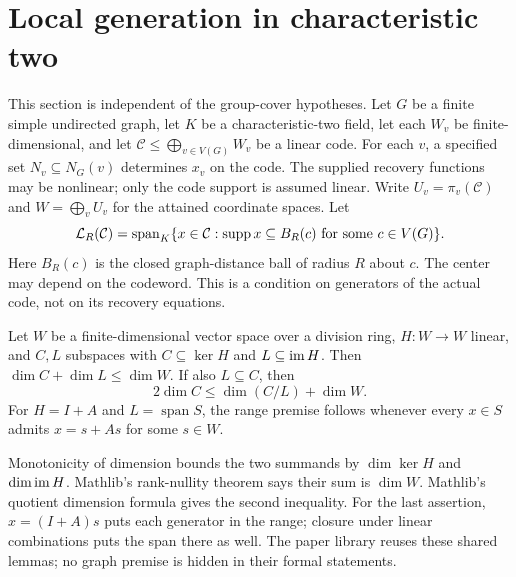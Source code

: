\section{Local generation in characteristic two}\label{sec:local}

This section is independent of the group-cover hypotheses. Let $G$
be a finite simple undirected graph, let $K$ be a characteristic-two
field, let each $W_v$ be finite-dimensional, and let
$\mathcal C\le\bigoplus_{v\in V(G)}W_v$ be a linear code.
For each $v$, a specified set $N_v\subseteq N_G(v)$ determines
$x_v$ on the code. The supplied recovery functions may be nonlinear;
only the code support is assumed linear. Write
$U_v=\pi_v(\mathcal C)$ and $W=\bigoplus_vU_v$ for the attained
coordinate spaces. Let
\[
 \mathcal L_R(\mathcal C)=\operatorname{span}_K
 \{x\in\mathcal C:\operatorname{supp} x\subseteq B_R(c)
                         \text{ for some }c\in V(G)\}.
\]
Here $B_R(c)$ is the closed graph-distance ball of radius $R$ about $c$.
The center may depend on the codeword. This is a condition on
generators of the actual code, not on its recovery equations.

\begin{lemma}\label{lem:kernel-range}
Let $W$ be a finite-dimensional vector space over a division ring,
$H:W\to W$ linear, and $C,L$ subspaces with $C\subseteq\ker H$
and $L\subseteq\operatorname{im} H$. Then
$\dim C+\dim L\le\dim W$. If also $L\subseteq C$, then
\[
 2\dim C\le\dim(C/L)+\dim W.
\]
For $H=I+A$ and $L=\operatorname{span}S$, the range premise follows
whenever every $x\in S$ admits $x=s+As$ for some $s\in W$.
\end{lemma}
\begin{outline}
Monotonicity of dimension bounds the two summands by
$\dim\ker H$ and $\dim\operatorname{im} H$. Mathlib's rank-nullity theorem
says their sum is $\dim W$. Mathlib's quotient dimension formula
gives the second inequality. For the last assertion, $x=(I+A)s$
puts each generator in the range; closure under linear combinations
puts the span there as well. The paper library reuses these shared
lemmas; no graph premise is hidden in their formal statements.
\end{outline}

